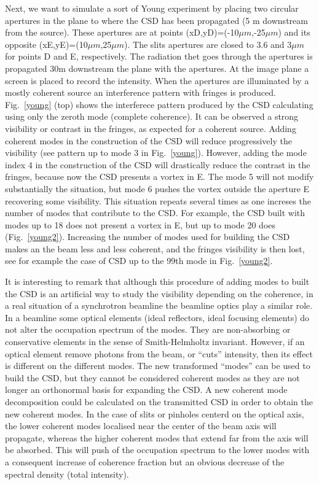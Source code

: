 \documentclass{iucr}              %
\newcommand{\inblue}[1]{{\color{blue}#1}}
\begin{document}
Next, we want to simulate a sort of Young experiment by placing two circular apertures in the plane to where the CSD has been propagated (5 m downstream from the source). These apertures are at points (xD,yD)=(-10$\mu m$,-25$\mu m$) and its opposite (xE,yE)=(10$\mu m$,25$\mu m$). The slits apertures are closed to 3.6 and 3$\mu m$ for points D and E, respectively. The radiation thet goes through the apertures is propagated 30m downstream the plane with the apertures. At the image plane a screen is placed to record the intensity. When the apertures are illuminated by a mostly coherent source an interference pattern with fringes is produced. \inblue{Fig.~\ref{young}} (top) shows the interferece pattern produced by the CSD calculating using only the zeroth mode (complete coherence). It can be observed a strong visibility or contrast in the fringes, as expected for a coherent source. Adding coherent modes in the construction of the CSD will reduce progressively the visibility (see pattern up to mode 3 in \inblue{Fig.~\ref{young}}). However, adding the mode index 4 in the construction of the CSD will drastically reduce the contrast in the fringes, because now the CSD presents a vortex in E. The mode 5 will not modify substantially the situation, but mode 6 pushes the vortex outside the aperture E recovering some visibility. This situation repeats several times as one increses the number of modes that contribute to the CSD. For example, the CSD built with modes up to 18 does not present a vortex in E, but up to mode 20 does (\inblue{Fig.~\ref{young2}}). Increasing the number of modes used for building the CSD makes an the beam less and less coherent, and the fringes visibility is then lost, see for example the case of CSD up to the 99th mode in \inblue{Fig.~\ref{young2}}. 

It is interesting to remark that although this procedure of adding modes to built the CSD is an artificial way to study the visibility depending on the coherence, in a real situation of a synchrotron beamline the beamline optics play a similar role. In a beamline some optical elements (ideal reflectors, ideal focusing elements) do not alter the occupation spectrum of the modes. They are non-absorbing or conservative elements in the sense of Smith-Helmholtz invariant. However, if an optical element remove photons from the beam, or ``cuts'' intensity, then its effect is different on the different modes. The new transformed ``modes'' can be used to build the CSD, but they cannot be considered coherent modes as they are not longer an orthonormal basis for expanding the CSD. A new coherent mode decomposition could be calculated on the transmitted CSD in order to obtain the new coherent modes. In the case of slits or pinholes centerd on the optical axis, the lower coherent modes localised near the center of the beam axis will propagate, whereas the higher coherent modes that extend far from the axis will be absorbed. This will push of the occupation spectrum to the lower modes with a consequent increase of coherence fraction but an obvious decrease of the spectral density (total intensity).     
\end{document}
